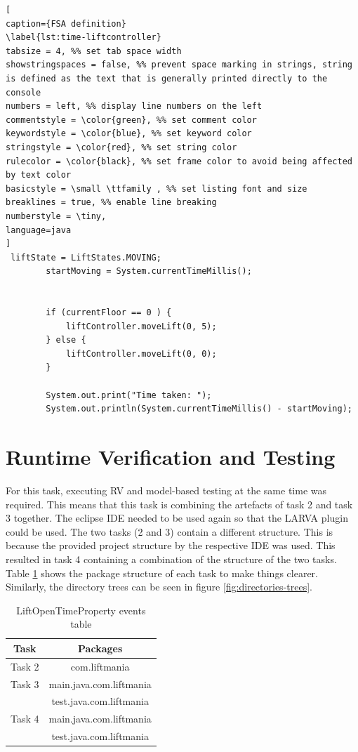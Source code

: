 \documentclass[a4paper, 12pt]{article}
\begin{document}
\begin{lstlisting}[
caption={FSA definition}
\label{lst:time-liftcontroller}
tabsize = 4, %% set tab space width
showstringspaces = false, %% prevent space marking in strings, string is defined as the text that is generally printed directly to the console
numbers = left, %% display line numbers on the left
commentstyle = \color{green}, %% set comment color
keywordstyle = \color{blue}, %% set keyword color
stringstyle = \color{red}, %% set string color
rulecolor = \color{black}, %% set frame color to avoid being affected by text color
basicstyle = \small \ttfamily , %% set listing font and size
breaklines = true, %% enable line breaking
numberstyle = \tiny,
language=java
]
 liftState = LiftStates.MOVING;
        startMoving = System.currentTimeMillis();


        if (currentFloor == 0 ) {
            liftController.moveLift(0, 5);
        } else {
            liftController.moveLift(0, 0);
        }

        System.out.print("Time taken: ");
        System.out.println(System.currentTimeMillis() - startMoving);

\end{lstlisting}



\section{Runtime Verification and Testing}
For this task, executing RV and model-based testing at the same time was required. This means that this task is combining the artefacts of task 2 and task 3 together.  The eclipse IDE needed to be used again so that the LARVA plugin could be used. The two tasks (2 and 3) contain a different structure. This is because the provided project structure by the respective IDE was used. This resulted in task 4 containing a combination of the structure of the two tasks. Table \ref{tab:packages-structure} shows the package structure of each task to make things clearer. Similarly, the directory trees can be seen in figure \ref{fig:directories-trees}. \\

\begin{table}
   \centering
   \begin{tabular}{@{}  |c|c| @{}} %
      \toprule
      Task   & Packages \\
      \midrule
      Task 2  &  com.liftmania\\
      Task 3 & main.java.com.liftmania  \\
      & test.java.com.liftmania\\
      Task 4  & main.java.com.liftmania\\
      & test.java.com.liftmania\\
      \bottomrule
   \end{tabular}
   \caption{LiftOpenTimeProperty events table}
   \label{tab:packages-structure}
\end{table}
\end{document}
